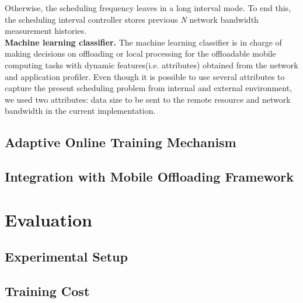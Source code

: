 \documentclass[10pt, conference, compsocconf]{IEEEtran}
\begin{document}
%
Otherwise, the scheduling frequency leaves in a long interval mode.
%
To end this, the scheduling interval controller stores previous
\textit{N} network bandwidth measurement histories.\\
%
\textbf{Machine learning classifier.} The machine learning classifier is
in charge of making decisions on offloading or local processing for the
offloadable mobile computing tasks with dynamic features(i.e.
attributes) obtained from the network and application profiler.
%
Even though it is possible to use several attributes to capture the
present scheduling problem from internal and external environment, we
used two attributes: data size to be sent to the remote resource and
network bandwidth in the current implementation.
%
%
\subsection{Adaptive Online Training Mechanism}
%
\subsection{Integration with Mobile Offloading Framework}
%
%
%
\section{Evaluation}
%
\subsection{Experimental Setup}
%
\subsection{Training Cost}
%
\end{document}
